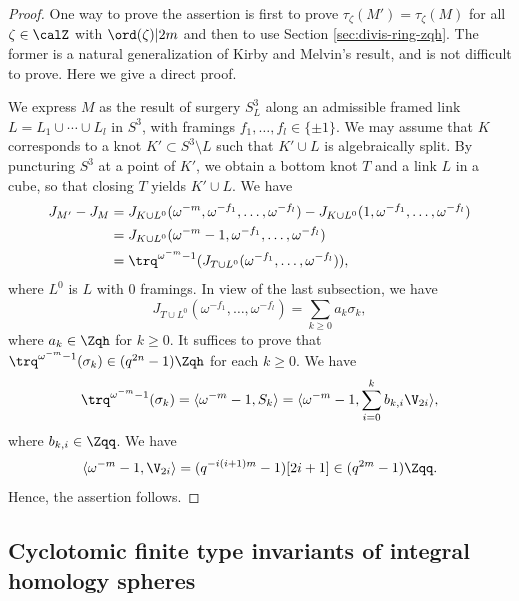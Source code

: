 \documentclass{amsart}
\numberwithin{equation}{section}
\numberwithin{figure}{section}
\theoremstyle{plain}
\theoremstyle{definition}
\theoremstyle{remark}
\begin{document}
\begin{proof}
  One way to prove the assertion is first to prove
  $\tau _\zeta (M')=\tau _\zeta (M)$ for all $\zeta \in \calZ$ with $\ord(\zeta )|2m$ and then
  to use Section \ref{sec:divis-ring-zqh}.  The former is a natural
  generalization of Kirby and Melvin's result, and is not difficult to
  prove.  Here we give a direct proof.

  We express $M$ as the result of surgery $S^3_{L}$ along an
  admissible framed link $L=L_1\cup \cdots\cup L_l$ in $S^3$, with framings
  $f_1,\ldots,f_l\in \{\pm 1\}$.  We may assume that $K$ corresponds to a knot
  $K'\subset S^3\setminus L$ such that $K'\cup L$ is algebraically split.  By
  puncturing $S^3$ at a point of $K'$, we obtain a bottom knot $T$ and
  a link $L$ in a cube, so that closing $T$ yields $K'\cup L$.  We have
  \begin{equation*}
    \begin{split}
      J_{M'}-J_M
      &= J_{K\cup L^0}(\omega ^{-m},\omega ^{-f_1},\ldots,\omega ^{-f_l})
      -J_{K\cup L^0}(1,\omega ^{-f_1},\ldots,\omega ^{-f_l})\\
      &= J_{K\cup L^0}(\omega ^{-m}-1,\omega ^{-f_1},\ldots,\omega ^{-f_l})\\
      &= \trq^{\omega ^{-m}-1}(J_{T\cup L^0}(\omega ^{-f_1},\ldots,\omega ^{-f_l})),
    \end{split}
  \end{equation*}
  where $L^0$ is $L$ with $0$ framings.  In view of the last
  subsection, we have
  \begin{equation*}
    J_{T\cup L^0}(\omega ^{-f_1},\ldots,\omega ^{-f_l})=\sum_{k\ge 0}a_k\sigma _k,
  \end{equation*}
  where $a_k\in \Zqh$ for $k\ge 0$.  It suffices to prove that
  $\trq^{\omega ^{-m}-1}(\sigma _k)\in (q^{2n}-1)\Zqh$ for each $k\ge 0$.  We have
  \begin{equation*}
    \trq^{\omega ^{-m}-1}(\sigma _k)=\langle \omega ^{-m}-1,S_k\rangle 
    =\langle \omega ^{-m}-1,\sum_{i=0}^{k}b_{k,i}\V_{2i}\rangle ,
  \end{equation*}
  where $b_{k,i}\in \Zqq$.  We have
  \begin{equation*}
    \langle \omega ^{-m}-1,\V_{2i}\rangle =(q^{-i(i+1)m}-1)[2i+1]\in (q^{2m}-1)\Zqq.
  \end{equation*}
  Hence, the assertion follows.
\end{proof}

\subsection{Cyclotomic finite type invariants of integral homology spheres}
\label{sec:cycl-finite-type}
\end{document}
